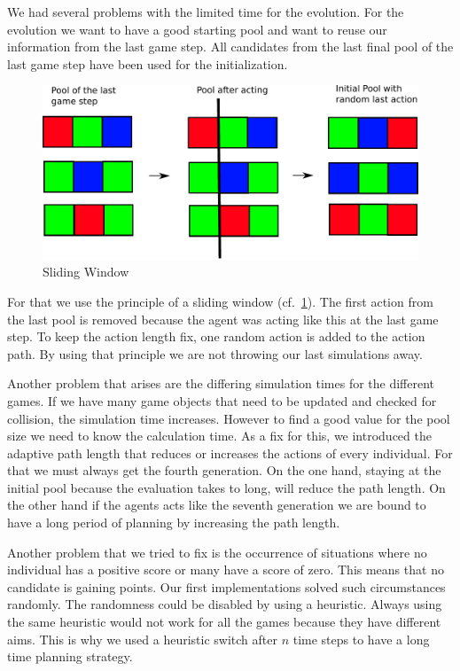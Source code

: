 We had several problems with the limited time for the evolution.
For the evolution we want to have a good starting pool and want to reuse our information from the last
game step. All candidates from the last final pool of the last game step have been used for the initialization.


\begin{figure}[H]
\centering
\includegraphics[scale=0.6]{images/sliding_window.pdf}
\caption{Sliding Window}
\label{fig:sliding_window}
\end{figure}

For that we use the principle of a sliding window (cf.~\cref{fig:sliding_window}). The first
action from the last pool is removed because the agent was acting like this at the last game step. To keep the action length fix, one random action is added to the action path.
By using that principle we are not throwing our last simulations away.

Another problem that arises are the differing simulation times for the different games. If we have many game objects that 
need to be updated and checked for collision, the simulation time increases.
However to find a good value for the pool size we need to know the calculation time.
As a fix for this, we introduced the adaptive path length that reduces or increases the actions
of every individual.
For that we must always get the fourth generation. On the one hand, staying at the initial
pool because the evaluation takes to long, will reduce the path length. On the other hand if the agents acts like 
the seventh generation we are bound to have a long period of planning by increasing the path length.

Another problem that we tried to fix is the occurrence of situations where no individual has a positive score or many have a score of zero. This means that no candidate is gaining points. Our first implementations solved such circumstances randomly. 
The randomness could be disabled by using a heuristic. Always using the same heuristic would not work
for all the games because they have different aims. 
This is why we used a heuristic switch after $n$ time steps to have a long time planning strategy.


